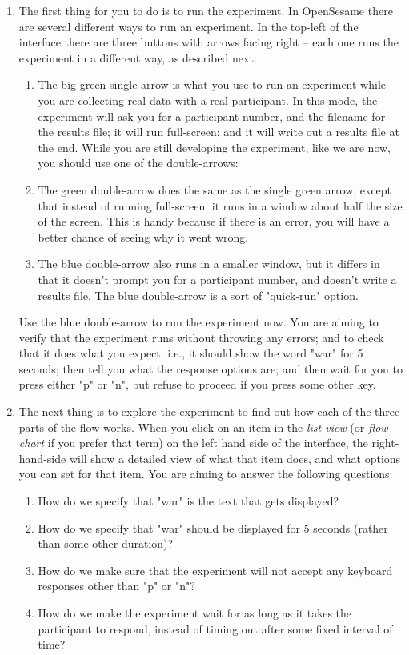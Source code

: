 \documentclass[a4paper]{tufte-handout}
\begin{document}
\begin{enumerate}
\item The first thing for you to do is to run the experiment. In OpenSesame there are several different ways to run an experiment. In the top-left of the interface there are three buttons with arrows facing right -- each one runs the experiment in a different way, as described next:

\begin{enumerate}
\item The big green single arrow is what you use to run an experiment while you are collecting real data with a real participant. In this mode, the experiment will ask you for a participant number, and the filename for the results file; it will run full-screen; and it will write out a results file at the end. While you are still developing the experiment, like we are now, you should use one of the double-arrows: 
\item The green double-arrow does the same as the single green arrow, except that instead of running full-screen, it runs in a window about half the size of the screen. This is handy because if there is an error, you will have a better chance of seeing why it went wrong.
\item The blue double-arrow also runs in a smaller window, but it differs in that it doesn't prompt you for a participant number, and doesn't write a results file. The blue double-arrow is a sort of "quick-run" option. 
\end{enumerate}

Use the blue double-arrow to run the experiment now. %
%
You are aiming to verify that the experiment runs without throwing any errors; and to check that it does what you expect: i.e., it should show the word "war" for 5 seconds; then tell you what the response options are; and then wait for you to press either "p" or "n", but refuse to proceed if you press some other key.

\item The next thing is to explore the experiment to find out how each of the three parts of the flow works. When you click on an item in the \emph{list-view} (or \emph{flow-chart} if you prefer that term) on the left hand side of the interface, the right-hand-side will show a detailed view of what that item does, and what options you can set for that item. %
%
You are aiming to answer the following questions:
\begin{enumerate}
\item How do we specify that "war" is the text that gets displayed?
\item How do we specify that "war" should be displayed for 5 seconds (rather than some other duration)?
\item How do we make sure that the experiment will not accept any keyboard responses other than "p" or "n"?
\item How do we make the experiment wait for as long as it takes the participant to respond, instead of timing out after some fixed interval of time?
\end{enumerate}
\end{enumerate}
\end{document}
